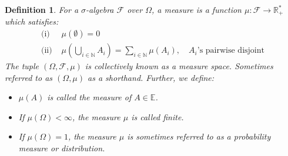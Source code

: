 \documentclass[12pt, a4paper]{article}
\newtheorem{definition}{Definition}[section]
\numberwithin{equation}{section}
\begin{document}
\begin{definition}
\label{measure_definition}
For a $\sigma$-algebra $\mathcal{F}$ over $\Omega$, a measure is a function $\mu: \mathcal{F}\rightarrow\mathbb{R}_+^*$ which satisfies:
\begin{align}
\textrm{(i) }&\mu(\emptyset)=0\\
\textrm{(ii) }&\mu\left(\bigcup_{i\in\mathbb{N}}A_i\right)=\sum_{i\in\mathbb{N}}\mu(A_i),\quad A_i\textrm{'s pairwise disjoint}
\end{align}
The tuple $(\Omega, \mathcal{F}, \mu)$ is collectively known as a measure space. Sometimes referred to as $(\Omega, \mu)$ as a shorthand. Further, we define:
\begin{itemize}
\item $\mu(A)$ is called the measure of $A\in\mathbb{E}$.
\item If $\mu(\Omega)<\infty$, the measure $\mu$ is called finite.
\item If $\mu(\Omega)=1$, the measure $\mu$ is sometimes referred to as a probability measure or distribution.
\end{itemize}
\end{definition}
\end{document}

